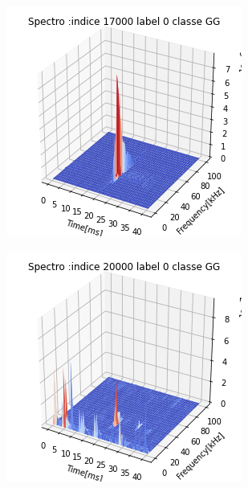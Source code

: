 \begin{figure}[!h]
  \centering
  \begin{subfigure}[b]{0.3\textwidth}
    \includegraphics[width=\textwidth]{./images/indice17000Spectro3Dlabel0classeGGsansprocessingsanszoom.png}
        \caption{}
  \end{subfigure}
  \begin{subfigure}[b]{0.3\textwidth}
    \includegraphics[width=\textwidth]{./images/indice20000Spectro3Dlabel9classeZCsansprocessingsanszoom.png}

\end{subfigure}
\end{figure}
